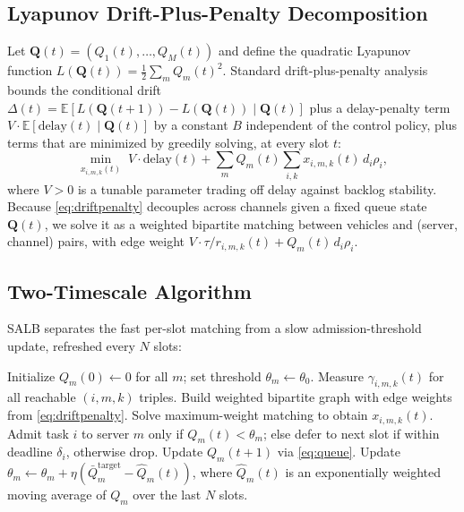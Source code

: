 \documentclass[journal,10pt]{IEEEtran}
\begin{document}
\subsection{Lyapunov Drift-Plus-Penalty Decomposition}
Let $\mathbf{Q}(t) = (Q_1(t),\dots,Q_M(t))$ and define the quadratic Lyapunov function $L(\mathbf{Q}(t)) = \frac{1}{2}\sum_m Q_m(t)^2$. Standard drift-plus-penalty analysis~\cite{ref8} bounds the conditional drift $\Delta(t) = \mathbb{E}[L(\mathbf{Q}(t+1)) - L(\mathbf{Q}(t)) \mid \mathbf{Q}(t)]$ plus a delay-penalty term $V \cdot \mathbb{E}[\text{delay}(t) \mid \mathbf{Q}(t)]$ by a constant $B$ independent of the control policy, plus terms that are minimized by greedily solving, at every slot $t$:
\begin{equation}
\min_{x_{i,m,k}(t)} \; V \cdot \text{delay}(t) + \sum_m Q_m(t) \sum_{i,k} x_{i,m,k}(t)\, d_i \rho_i,
\label{eq:driftpenalty}
\end{equation}
where $V > 0$ is a tunable parameter trading off delay against backlog stability. Because \eqref{eq:driftpenalty} decouples across channels given a fixed queue state $\mathbf{Q}(t)$, we solve it as a weighted bipartite matching between vehicles and (server, channel) pairs, with edge weight $V \cdot \tau/r_{i,m,k}(t) + Q_m(t)\, d_i \rho_i$.

\subsection{Two-Timescale Algorithm}
SALB separates the fast per-slot matching from a slow admission-threshold update, refreshed every $N$ slots:
\begin{algorithm}[t]
\caption{SALB -- Spectrum-Aware Adaptive Load Balancer}
\label{alg:salb}
\begin{algorithmic}[1]
\STATE Initialize $Q_m(0) \leftarrow 0$ for all $m$; set threshold $\theta_m \leftarrow \theta_0$.
  \STATE Measure $\gamma_{i,m,k}(t)$ for all reachable $(i,m,k)$ triples.
  \STATE Build weighted bipartite graph with edge weights from \eqref{eq:driftpenalty}.
  \STATE Solve maximum-weight matching to obtain $x_{i,m,k}(t)$.
  \STATE Admit task $i$ to server $m$ only if $Q_m(t) < \theta_m$; else defer to next slot if within deadline $\delta_i$, otherwise drop.
  \STATE Update $Q_m(t+1)$ via \eqref{eq:queue}.
    \STATE Update $\theta_m \leftarrow \theta_m + \eta \left(\bar{Q}_m^{\text{target}} - \hat{Q}_m(t)\right)$, where $\hat{Q}_m(t)$ is an exponentially weighted moving average of $Q_m$ over the last $N$ slots.
  \ENDIF
\ENDFOR
\end{algorithmic}
\end{algorithm}
\end{document}

